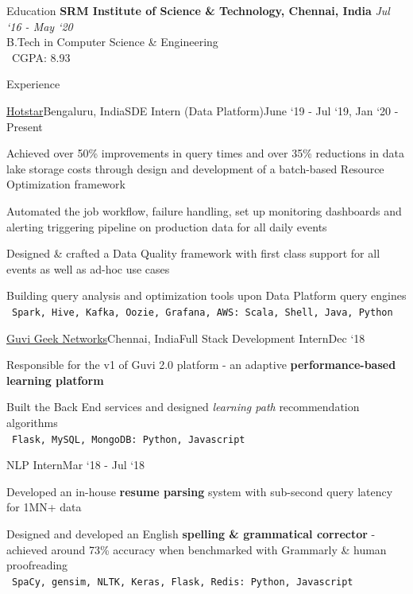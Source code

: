 \documentclass{resume}
\begin{document}
  \begin{rSection}{Education}
    {\bf SRM Institute of Science \& Technology, Chennai, India} \hfill {\em Jul `16 - May `20} \\ 
    { B.Tech in Computer Science \& Engineering } \\
    \textbullet\ CGPA: 8.93
    
  \end{rSection}
  
  \begin{rSection}{Experience}
  
    \begin{rSubsection}{\href{https://tech.hotstar.com/}{Hotstar}}{Bengaluru, India}{SDE Intern (Data Platform)}{June `19 - Jul `19, Jan `20 - Present}
    \item Achieved over 50\% improvements in query times and over 35\% reductions in data lake storage costs through design and development of a batch-based Resource Optimization framework
    \item Automated the job workflow, failure handling, set up monitoring dashboards and alerting triggering pipeline on production data for all daily events
    \item Designed \& crafted a Data Quality framework with first class support for all  events as well as ad-hoc use cases
    \item Building query analysis and optimization tools upon Data Platform query engines\\
    \textbullet\ \texttt{Spark, Hive, Kafka, Oozie, Grafana, AWS: Scala, Shell, Java, Python}
    \end{rSubsection}

    \begin{rSubsection}{\href{https://www.guvi.in/}{Guvi Geek Networks}}{Chennai, India}{Full Stack Development Intern}{Dec `18}
    \item[] Responsible for the v1 of Guvi 2.0 platform - an adaptive \textbf{performance-based learning platform}
    \item Built the Back End services and designed \textit{learning path} recommendation algorithms\\
    \textbullet\ \texttt{Flask, MySQL, MongoDB: Python, Javascript}
    \end{rSubsection}

    \vspace*{-\baselineskip}

    \begin{rSubsection}{}{}{NLP Intern}{Mar `18 - Jul `18}
    \item Developed an in-house \textbf{resume parsing} system with sub-second query latency for 1MN+ data
    \item Designed and developed an English \textbf{spelling \& grammatical corrector} - achieved around 73\% accuracy when benchmarked with Grammarly \& human proofreading\\
    \textbullet\ \texttt{SpaCy, gensim, NLTK, Keras, Flask, Redis: Python, Javascript}
    \end{rSubsection}
  
  \end{rSection}
  
\end{document}
